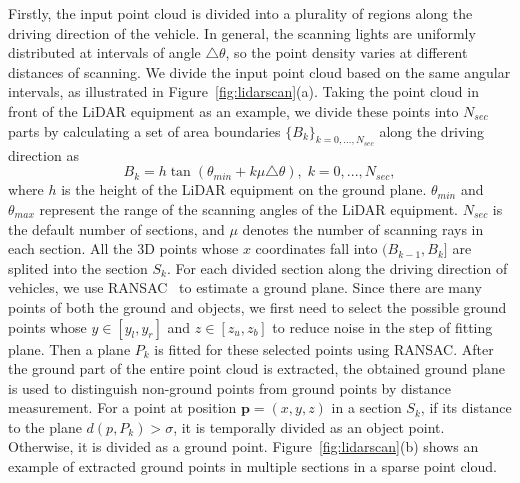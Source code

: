 \documentclass{sip}%
\begin{document}
Firstly, the input point cloud is divided into a plurality of regions along the driving direction of the vehicle.
%
In general, the scanning lights are uniformly distributed at intervals of angle $\triangle\theta$, so the point density varies at different distances of scanning.
We divide the input point cloud based on the same angular intervals, as illustrated in Figure~\ref{fig:lidarscan}(a).
%
Taking the point cloud in front of the LiDAR equipment as an example, we divide these points into $N_{sec}$ parts by calculating a set of area boundaries $\{B_k\}_{k=0,\dots,N_{sec}}$ along the driving direction as
%
\begin{equation}\label{111}
B_k=h\tan(\theta_{min}+k\mu\triangle\theta),\; k=0,...,N_{sec} ,
\end{equation}
where $h$ is the height of the LiDAR equipment on the ground plane.
$\theta_{min}$ and $\theta_{max}$ represent the range of the scanning angles of the LiDAR equipment.
$N_{sec}$ is the default number of sections, and $\mu$ denotes the number of scanning rays in each section.
All the 3D points whose $x$ coordinates fall into $(B_{k-1}, B_k\rbrack$ are splited into
the section $S_k$.
For each divided section along the driving direction of vehicles, we use RANSAC~\cite{fischler1981random} to estimate a ground plane. 
Since there are many points of both the ground and objects, we first need to select the possible ground points whose $y \in [y_{l}, y_r]$ and $z\in[z_u, z_b]$ to reduce noise in the step of fitting plane.
Then a plane $P_k$ is fitted for these selected points using RANSAC.
%
After the ground part of the entire point cloud is extracted, the obtained ground plane is used to distinguish non-ground points from ground points by distance measurement.
For a point at position $\mathbf{p}=(x,y,z)$ in a section $S_k$, if its distance to the plane $d(p,P_k)>\sigma$, it is temporally divided as an object point. Otherwise, it is divided as a ground point.
Figure~\ref{fig:lidarscan}(b) shows an example of extracted ground points in multiple sections in a sparse point cloud.
\end{document}

